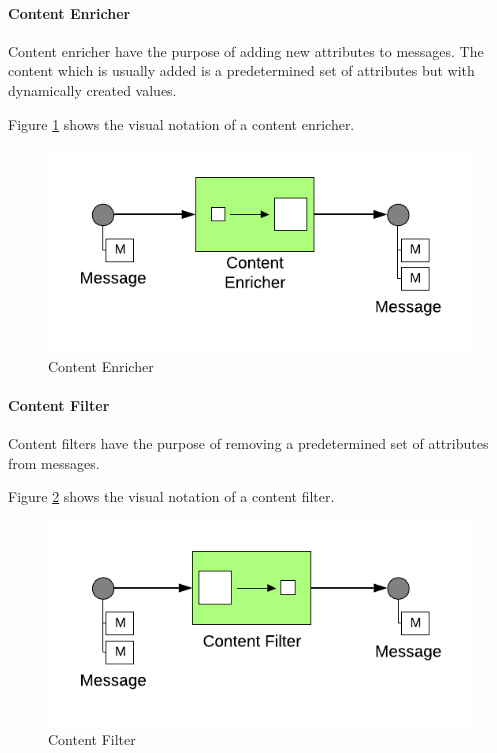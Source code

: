 \paragraph{Content Enricher}

Content enricher have the purpose of adding new attributes to messages. The content which is usually added is a predetermined set of attributes but with dynamically created values.

Figure \ref{messaging:enricher} shows the visual notation of a content enricher.


\begin{figure}[H]
    \centering
    \includegraphics[scale=0.6]{Diagrams/Messaging/10. Content Enricher.pdf}
    \caption{Content Enricher}
    \label{messaging:enricher}
\end{figure}

\paragraph{Content Filter}

Content filters have the purpose of removing a predetermined set of attributes from messages.

Figure \ref{messaging:filter3} shows the visual notation of a content filter.

\begin{figure}[H]
    \centering
    \includegraphics[scale=0.6]{Diagrams/Messaging/11. Content Filter.pdf}
    \caption{Content Filter}
    \label{messaging:filter3}
\end{figure}

